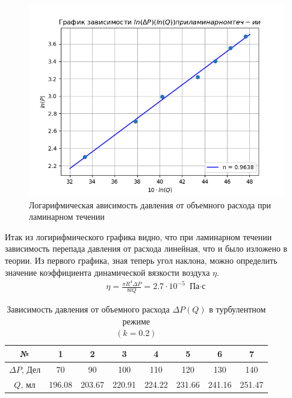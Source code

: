 \begin{figure}[h!]
    \centering
    \includegraphics[width=12cm]{plot3ln.png}
    \caption{Логарифмическая ависимость давления от объемного расхода 
    при ламинарном течении}
    \label{fig:plot3ln}
\end{figure}

Итак из логирифмического графика видно, что при ламинарном течении
зависимость перепада давления от расхода линейная, что и было изложено 
в теории. Из первого графика, зная теперь угол наклона, можно определить 
значение коэффициента динамической вязкости воздуха $\eta$.
\begin{align}
    \eta = \frac{\pi R^4 \Delta P}{8 l Q} = 2.7 \cdot 10^{-5} \text{ Па$\cdot$с}
\end{align}

\begin{table}[h!]
    \centering
    \begin{tabular}{|c|c|c|c|c|c|c|c|}
        \hline
        №  & 1 & 2 & 3 & 4 & 5 & 6 & 7\\\hline 
        $\Delta P$, Дел & 70 & 90 & 100 & 110 & 120 & 130 & 140\\\hline 
        $Q$, мл & 196.08 & 203.67 & 220.91 & 224.22 & 231.66 & 241.16 & 251.47\\\hline 
    \end{tabular}
    \caption{Зависимость давления от объемного расхода $\Delta P(Q)$ 
    в турбулентном режиме\\ $(k = 0.2)$}
\end{table}

